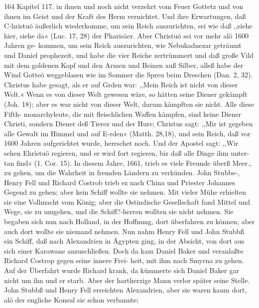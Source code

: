 164 Kapitel 117.
in ihnen und noch nicht verzehrt vom Feuer Gottetz und von
ihnen im Geist und der Kraft des Herm vernichtet. Und ihre
Erwartungen, daß C-hristuö äußerlich wiederkomme, um sein Reich
auszurichten, sei wie daß ,,siehe hier, siehe da« (Luc. 17, 28) der
Pharisäer. Aber Christuö sei vor mehr alö 1600 Jahren ge-
kommen, um sein Reich auszurichten, wie Nebukadnezar geträumt
und Daniel prophezeit, und habe die vier Reiche zertrümmert und
daß große Vild mit dem goldenen Kopf und den Armen und
Beinen auß Silber, alleß habe der Wind Gotteö weggeblasen
wie im Sommer die Spreu beim Dreschen (Dan. 2, 32).
Christus habe gesagt, als er auf Grden war: ,,Mein Reich ist
nicht von dieser Welt.« Wenn es von dieser Welt gewesen wäre,
so hätten seine Diener gekämpft (Joh. 18); aber es war nicht
von dieser Welt, darum kämpften sie nicht. Alle diese Fifth-
monarchyleute, die mit fleischlichen Waffen kämpfen, sind keine
Diener Christi, sondern Diener deß Tierez und der Hure; Christus
sagt: ,,Mir ist gegeben alle Gewalt im Himmel und auf E-rden«
(Matth. 28,18), und sein Reich, daß vor 1600 Jahren aufgerichtet
wurde, herrschet noch. Und der Apostel sagt: ,,Wir sehen Ehristuö
regieren, und er wird fort regieren, biz daß alle Dinge ihm unter-
tan find« (1. Cor. 15).
In diesem Jahre, 1661, trieb es viele Freunde überß Meer.,
zu gehen, um die Wahrheit in fremden Ländern zu verkünden.
John Stubbe-, Henry Fell und Richard Costrob trieb ez nach
China und Priester Johannes Gegend zu gehen; aber kein Schiff
wollte sie nehmen. Mit vieler Mühe erhielten sie eine Vollmacht
vom König; aber die Ostindische Gesellschaft fand Mittel und
Wege, sie zu umgehen, und die Schiff?-herren wollten sie nicht
nehmen. Sie begaben sich nun nach Holland, in der Hoffnung,
dort überfahren zu können; aber auch dort wollte sie niemand
nehmen. Nun nahm Henry Fell und John Stubbß ein Schiff,
daß nach Alexandrien in Ägypten ging, in der Absicht, von dort
aus sich einer Karawane anzuschließen. Doch da kam Daniel
Baker und veranlaßte Richard Costrop gegen seine innere Frei-
heit, mit ihm nach Smyrna zu gehen. Auf der Überfahrt wurde
Richard krank, da kümmerte sich Daniel Baker gar nicht um ihn
und er starb. Aber der hartherzige Mann verlor später seine Stelle.
John Stubbß und Henry Fell erreichten Alexandrien, aber
sie waren kaum dort, alö der engliche Konsul sie schon verbannte;



